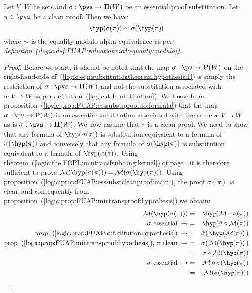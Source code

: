 \begin{prop}\label{logic:prop:substitutiontheorem:hypothesis}
Let $V$, $W$ be sets and $\sigma:\pvs\to{\bf\Pi}(W)$ be an essential
proof substitution. Let $\pi\in\pvs$ be a clean proof. Then we have:
    \begin{equation}\label{logic:eqn:substitutiontheorem:hypothesis:1}
    \hyp(\sigma(\pi))\sim\sigma(\hyp(\pi))
    \end{equation}
where $\sim$ is the equality modulo alpha equivalence as
per {\em
definition~(\ref{logic:def:FUAP:valuationmod:equality:modulo})}.
\end{prop}
\begin{proof}
Before we start, it should be noted that the map $\sigma:\pv\to{\bf
P}(W)$ on the right-hand-side
of~(\ref{logic:eqn:substitutiontheorem:hypothesis:1}) is simply the
restriction of $\sigma:\pvs\to{\bf\Pi}(W)$ and not the substitution
associated with $\sigma:V\to W$ as per
definition~(\ref{logic:def:substitution}). We know from
proposition~(\ref{logic:prop:FUAP:esssubst:proof:to:formula}) that
the map $\sigma:\pv\to{\bf P}(W)$ is an essential substitution
associated with the same $\sigma:V\to W$ as is
$\sigma:\pvs\to{\bf\Pi}(W)$. We now assume that $\pi$ is a clean
proof. We need to show that any formula of $\hyp(\sigma(\pi))$ is
substitution equivalent to a formula of $\sigma(\hyp(\pi))$ and
conversely that any formula of $\sigma(\hyp(\pi))$ is substitution
equivalent to a formula of $\hyp(\sigma(\pi))$. Using
theorem~(\ref{logic:the:FOPL:mintransfsubcong:kernel}) of
page~\pageref{logic:the:FOPL:mintransfsubcong:kernel} it is
therefore sufficient to prove ${\cal M}(\hyp(\sigma(\pi)))={\cal
M}(\sigma(\hyp(\pi)))$. Using
proposition~(\ref{logic:prop:FUAP:esssubstcleanproof:main}), the
proof $\sigma(\pi)$ is clean and consequently from
proposition~(\ref{logic:prop:FUAP:mintransproof:hypothesis}) we
obtain:
    \begin{eqnarray*}
    {\cal M}(\hyp(\sigma(\pi)))&=&\hyp({\cal M}\circ\sigma(\pi))\\
    \mbox{$\sigma$ essential}\ \rightarrow
    &=&\hyp(\bar{\sigma}\circ{\cal M}(\pi))\\
    \mbox{prop.~(\ref{logic:prop:FUAP:substitution:hypothesis})}\ \rightarrow
    &=&\bar{\sigma}(\,\hyp({\cal M}(\pi))\,)\\
    \mbox{prop.~(\ref{logic:prop:FUAP:mintransproof:hypothesis}), $\pi$ clean}\ \rightarrow
    &=&\bar{\sigma}(\,{\cal M}(\hyp(\pi))\,)\\
    &=&\bar{\sigma}\circ{\cal M}(\hyp(\pi))\\
    \mbox{$\sigma$ essential}\ \rightarrow
    &=&{\cal M}\circ\sigma(\hyp(\pi))\\
    &=&{\cal M}(\sigma(\hyp(\pi)))\\
    \end{eqnarray*}
\end{proof}
